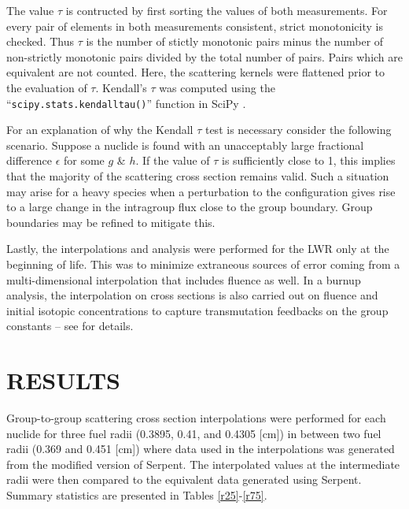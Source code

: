 \documentclass{physor2012}
\begin{document}
The value $\tau$ is contructed by first sorting the values of both measurements.
For every pair of elements in both measurements consistent, strict monotonicity
is checked.  Thus $\tau$ is the number of stictly monotonic pairs minus the number
of non-strictly monotonic pairs divided by the total number of pairs.  
Pairs which are equivalent are not counted.  Here, the scattering kernels
were flattened prior to the evaluation of $\tau$.  Kendall's $\tau$ was 
computed using the ``\texttt{scipy.stats.kendalltau()}'' function in SciPy \cite{SciPy}.

For an explanation of why the Kendall $\tau$ test is necessary consider the following
scenario.  Suppose a nuclide is found with an unacceptably large fractional
difference $\epsilon$ for some $g$ \& $h$.  If the value of $\tau$ is sufficiently
close to 1, this implies that the majority of the scattering cross section
remains valid.  Such a situation may arise for a heavy species when a perturbation 
to the configuration gives rise to a large change in the intragroup flux close to 
the group boundary.  Group boundaries may be refined to mitigate this.

Lastly, the interpolations and analysis were performed for the LWR only
at the beginning of life.  This was to minimize extraneous sources of error
coming from a multi-dimensional interpolation that includes fluence as well.  
In a burnup analysis, the interpolation on cross sections is also carried out 
on fluence and initial isotopic concentrations to capture transmutation feedbacks 
on the group constants -- see \cite{Scopatz2009} for details.

\section{RESULTS}
\label{sec:results}

Group-to-group scattering cross section interpolations were performed for
each nuclide for three fuel radii (0.3895, 0.41, and 0.4305 [cm]) in between two
fuel radii (0.369 and 0.451 [cm]) where data used in the interpolations was generated 
from the modified version of Serpent.  The interpolated values at the intermediate 
radii were then compared to the equivalent data generated using Serpent.  Summary 
statistics are presented in Tables \ref{r25}-\ref{r75}.
\end{document}
